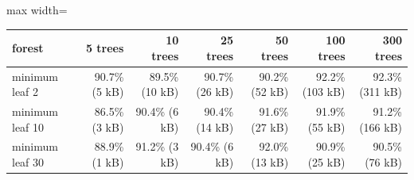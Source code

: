 \begin{adjustbox}{max width=\textwidth}
{\scriptsize
\begin{tabular}{lrrrrrr}
\toprule
\textbf{forest} & \textbf{5 trees} & \textbf{10 trees} & \textbf{25 trees} & \textbf{50 trees} & \textbf{100 trees} & \textbf{300 trees} \\
\midrule
minimum leaf 2 & 90.7\% (5 kB) & 89.5\% (10 kB) & 90.7\% (26 kB) & 90.2\% (52 kB) & 92.2\% (103 kB) & 92.3\% (311 kB) \\
minimum leaf 10 & 86.5\% (3 kB) & 90.4\% (6 kB) & 90.4\% (14 kB) & 91.6\% (27 kB) & 91.9\% (55 kB) & 91.2\% (166 kB) \\
minimum leaf 30 & 88.9\% (1 kB) & 91.2\% (3 kB) & 90.4\% (6 kB) & 92.0\% (13 kB) & 90.9\% (25 kB) & 90.5\% (76 kB) \\
\bottomrule
\end{tabular}
}
\end{adjustbox}
